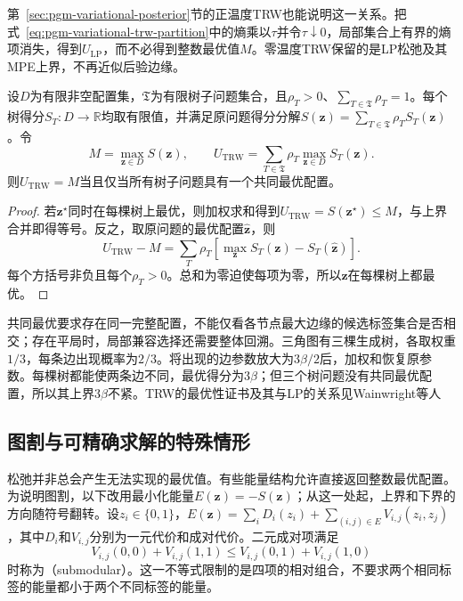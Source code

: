 第~\ref{sec:pgm-variational-posterior}节的正温度TRW也能说明这一关系。把式~\eqref{eq:pgm-variational-trw-partition}中的熵乘以$\tau$并令$\tau\downarrow0$，局部集合上有界的熵项消失，得到$U_{\mathrm{LP}}$，而不必得到整数最优值$M$。零温度TRW保留的是LP松弛及其MPE上界，不再近似后验边缘。

\begin{lemma}[树一致的最优性证书]
  \label{lem:pgm-variational-tree-agreement}
  设$D$为有限非空配置集，$\mathfrak T$为有限树子问题集合，且$\rho_T>0$、$\sum_{T\in\mathfrak T}\rho_T=1$。每个树得分$S_T:D\to\mathbb R$均取有限值，并满足原问题得分分解$S(\bm z)=\sum_{T\in\mathfrak T}\rho_TS_T(\bm z)$。令
  \[
    M=\max_{\bm z\in D}S(\bm z),
    \qquad
    U_{\mathrm{TRW}}
      =\sum_{T\in\mathfrak T}\rho_T
         \max_{\bm z\in D}S_T(\bm z).
  \]
  则$U_{\mathrm{TRW}}=M$当且仅当所有树子问题具有一个共同最优配置。
\end{lemma}
\begin{proof}
  若$\bm z^\star$同时在每棵树上最优，则加权求和得到$U_{\mathrm{TRW}}=S(\bm z^\star)\leq M$，与上界合并即得等号。反之，取原问题的最优配置$\widehat{\bm z}$，则
  \[
    U_{\mathrm{TRW}}-M
      =\sum_T\rho_T
         \left[\max_{\bm z}S_T(\bm z)-S_T(\widehat{\bm z})\right].
  \]
  每个方括号非负且每个$\rho_T>0$。总和为零迫使每项为零，所以$\widehat{\bm z}$在每棵树上都最优。
\end{proof}

共同最优要求存在同一完整配置，不能仅看各节点最大边缘的候选标签集合是否相交；存在平局时，局部兼容选择还需要整体回溯。三角图有三棵生成树，各取权重$1/3$，每条边出现概率为$2/3$。将出现的边参数放大为$3\beta/2$后，加权和恢复原参数。每棵树都能使两条边不同，最优得分为$3\beta$；但三个树问题没有共同最优配置，所以其上界$3\beta$不紧。TRW的最优性证书及其与LP的关系见Wainwright等人

\subsection{图割与可精确求解的特殊情形}
\label{sec:pgm-variational-graph-cut-special}
\label{sec:pgm-variational-graph-cuts}

松弛并非总会产生无法实现的最优值。有些能量结构允许直接返回整数最优配置。为说明图割，以下改用最小化能量$E(\bm z)=-S(\bm z)$；从这一处起，上界和下界的方向随符号翻转。设$z_i\in\{0,1\}$，$E(\bm z)=\sum_iD_i(z_i)+\sum_{(i,j)\in E}V_{i,j}(z_i,z_j)$，其中$D_i$和$V_{i,j}$分别为一元代价和成对代价。二元成对项满足
\begin{equation}
  V_{i,j}(0,0)+V_{i,j}(1,1)
    \leq V_{i,j}(0,1)+V_{i,j}(1,0)
  \label{eq:pgm-variational-submodular}
\end{equation}
时称为（submodular）。这一不等式限制的是四项的相对组合，不要求两个相同标签的能量都小于两个不同标签的能量。

